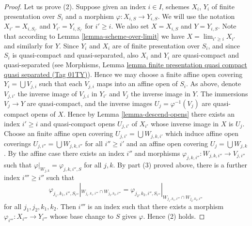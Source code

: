 \documentclass{amsart}
\theoremstyle{plain}
\theoremstyle{definition}
\theoremstyle{remark}
\numberwithin{equation}{subsection}
\def\lim{\mathop{\mathrm{lim}}\nolimits}
\begin{document}
\begin{proof}
\medskip\noindent
Let us prove (2). Suppose given an index $i \in I$, schemes
$X_i$, $Y_i$ of finite presentation over $S_i$ and a morphism
$\varphi : X_{i, S} \to Y_{i, S}$. We will use the notation
$X_{i'} = X_{i, S_{i'}}$ and $Y_{i'} = Y_{i, S_{i'}}$ for
$i' \geq i$. We also set $X = X_{i, S}$ and $Y = Y_{i, S}$.
Note that according to Lemma \ref{lemma-scheme-over-limit} we have
$X = \lim_{i' \geq i} X_{i'}$ and similarly for $Y$.
Since $Y_i$ and $X_i$ are of finite presentation
over $S_i$, and since $S_i$ is quasi-compact and quasi-separated, also
$X_i$ and $Y_i$ are quasi-compact and quasi-separated
(see Morphisms,
Lemma \href{https://stacks.math.columbia.edu/tag/01TY}{lemma finite presentation quasi compact quasi separated (Tag 01TY)}).
Hence we may choose a finite affine open covering
$Y_i = \bigcup V_{j, i}$ such that each $V_{j, i}$ maps into
an affine open of $S_i$. As above, denote $V_{j, i'}$ the inverse
image of $V_{j, i}$ in $Y_{i'}$ and $V_j$ the inverse image in $Y$.
The immersions $V_j \to Y$ are quasi-compact, and the inverse images
$U_j = \varphi^{-1}(V_j)$ are quasi-compact opens of $X$.
Hence by Lemma \ref{lemma-descend-opens} there exists an index
$i' \geq i$ and quasi-compact opens $U_{j, i'}$ of $X_{i'}$
whose inverse image in $X$ is $U_j$. Choose an finite affine open covering
$U_{j, i'} = \bigcup W_{j, k, i'}$ which induce affine open
coverings $U_{j, i''} = \bigcup W_{j, k, i''}$
for all $i'' \geq i'$ and an affine open covering
$U_j = \bigcup W_{j, k}$. By the affine case there exists
an index $i''$ and morphisms
$\varphi_{j, k, i''} : W_{j, k, i''} \to V_{j, i''}$
such that
$\varphi|_{W_{j, k}} = \varphi_{j, k, i'', S}$ for all $j, k$.
By part (3) proved above, there is a further index $i''' \geq i''$
such that
$$
\varphi_{j_1, k_1, i'', S_{i'''}}|_{W_{j_1, k_1, i'''} \cap W_{j_2, k_2, i'''}}
=
\varphi_{j_2, k_2, i'', S_{i'''}}|_{W_{j_1, k_1, i'''} \cap W_{j_2, k_2, i'''}}
$$
for all $j_1, j_2, k_1, k_2$. Then $i'''$ is an index such that
there exists a morphism $\varphi_{i'''} : X_{i'''} \to Y_{i'''}$
whose base change to $S$ gives $\varphi$. Hence (2) holds.


\end{proof}
\end{document}
